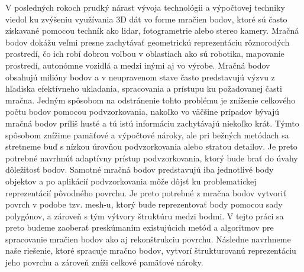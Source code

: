 \noindent V posledných rokoch prudký nárast vývoja technológii a výpočtovej techniky viedol ku zvýšeniu využívania 3D dát vo forme mračien bodov, ktoré sú často získavané pomocou techník ako \acrshort{lidar}, fotogrametrie alebo stereo kamery. Mračná bodov dokážu veľmi presne zachytávať geometrickú reprezentáciu rôznorodých prostredí, čo ich robí dobrou voľbou v oblastiach ako sú robotika, mapovanie prostredí, autonómne vozidlá a medzi inými aj vo výrobe.
\newline\indent Mračná bodov obsahujú milióny bodov a v neupravenom stave často predstavujú výzvu z hľadiska efektívneho ukladania, spracovania a prístupu ku požadovanej časti mračna. Jedným spôsobom na odstránenie tohto problému je zníženie celkového počtu bodov pomocou podvzorkovania, nakoľko vo väčšine prípadov bývajú mračná bodov príliš husté a tú istú informáciu zachytávajú niekoľko krát. Týmto spôsobom znížime pamäťové a výpočtové nároky, ale pri bežných metódach sa stretneme buď s nízkou úrovňou podvzorkovania alebo stratou detailov. Je preto potrebné navrhnúť adaptívny prístup podvzorkovania, ktorý bude brať do úvahy dôležitosť bodov.
\newline\indent Samotné mračná bodov predstavujú iba jednotlivé body objektov a po aplikácií podvzorkovania môže dôjsť ku problematickej reprezentácií pôvodného povrchu. Je preto potrebné z mračna bodov vytvoriť povrch v podobe tzv. mesh-u, ktorý bude reprezentovať body pomocou sady polygónov, a zároveň s tým výtvory štruktúru medzi bodmi.
\newline\indent V tejto práci sa preto budeme zaoberať preskúmaním existujúcich metód a algoritmov pre spracovanie mračien bodov ako aj rekonštrukciu povrchu. Následne navrhneme naše riešenie, ktoré spracuje mračno bodov, vytvorí štrukturovanú reprezentáciu jeho povrchu a zároveň zníži celkové pamäťové nároky.